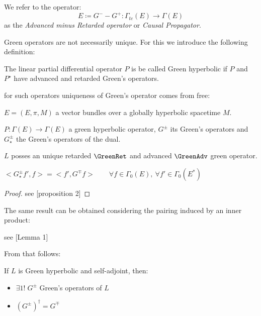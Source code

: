 \documentclass[a4paper,12pt]{scrartcl}    %
\begin{document}
		
		\begin{notationfix}
			We refer to the operator:
			\begin{displaymath}
				E \coloneqq G^-  - G^+ : \Gamma_{tc}(E) \rightarrow \Gamma(E)
			\end{displaymath}
			as the \emph{Advanced minus Retarded operator} or \emph{Causal Propagator}\cite{primer}.
		\end{notationfix}		
		
		Green operators are not necessarily unique. For this we introduce the following definition:
		\begin{definition}
			The linear partial differential operator $P$ is be called Green hyperbolic if $P$ and $P^\star$ have advanced and retarded Green’s operators.
		\end{definition}
		for such operators uniqueness of Green's operator comes from free:
		\begin{theorem}
			\begin{hypothesis}
				\item $E=(E,\pi,M)$ a vector bundles over a globally hyperbolic spacetime $M$.
				\item $P:\Gamma(E) \rightarrow \Gamma(E)$ a green hyperbolic operator, $G^\pm$ its Green's operators and $G_\star^\pm$ the Green's operators of the dual.
			\end{hypothesis}		
			\begin{thesis}
				\item $L$ posses an unique retarded $\GreenRet$ and advanced $\GreenAdv$ green operator.
				\item $<G_\star^\pm f', f> = <f', G^\mp f > \qquad \forall f \in \Gamma_0(E),\: \forall f' \in \Gamma_0(E^*)$
			\end{thesis}
		\end{theorem}
		\begin{proof}
			see \cite{advances}[proposition 2]
		\end{proof}
		
		The same result can be obtained considering the pairing induced by an inner product:
		\begin{corollary}
			see \cite{advances}[Lemma 1]
		\end{corollary}
		From that follows:
		\begin{corollary}
			If $L$ is Green hyperbolic and self-adjoint, then:
			\begin{itemize}
				\item $\exists 1 ! \; G^\pm$ Green's operators of $L$
				\item $(G^\pm)^\dagger = G^\mp$
			\end{itemize}
		\end{corollary}
\end{document}
